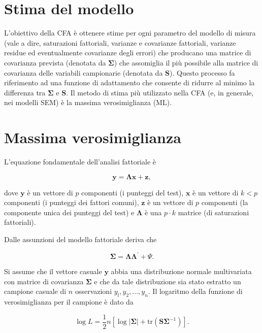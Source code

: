 \documentclass[
  11pt,
]{krantz}
\theoremstyle{definition}
\theoremstyle{definition}
\theoremstyle{definition}
\theoremstyle{definition}
\theoremstyle{remark}
\begin{document}
\hypertarget{stima-del-modello}{%
\section{Stima del modello}\label{stima-del-modello}}

L'obiettivo della CFA è ottenere stime per ogni parametro del modello di misura (vale a dire, saturazioni fattoriali, varianze e covarianze fattoriali, varianze residue ed eventualmente covarianze degli errori) che producano una matrice di covarianza prevista (denotata da \(\boldsymbol{\Sigma}\)) che assomiglia il più possibile alla matrice di covarianza delle variabili campionarie (denotata da \(\boldsymbol{S}\)). Questo processo fa riferimento ad una funzione di adattamento che consente di ridurre al minimo la differenza tra \(\boldsymbol{\Sigma}\) e \(\boldsymbol{S}\). Il metodo di stima più utilizzato nella CFA (e, in generale, nei modelli SEM) è la massima verosimiglianza (ML).

\hypertarget{massima-verosimiglianza}{%
\section{Massima verosimiglianza}\label{massima-verosimiglianza}}

L'equazione fondamentale dell'analisi fattoriale è

\[
\boldsymbol y = \boldsymbol \Lambda  \boldsymbol x  + \boldsymbol z, 
\]

dove \(\boldsymbol{y}\) è un vettore di \(p\) componenti (i punteggi del test), \(\boldsymbol{x}\) è un vettore di \(k < p\) componenti (i punteggi dei fattori comuni), \(\boldsymbol{z}\) è un vettore di \(p\) componenti (la componente unica dei punteggi del test) e \(\boldsymbol{\Lambda}\) è una \(p \cdot k\) matrice (di saturazioni fattoriali).

Dalle assunzioni del modello fattoriale deriva che

\[
\boldsymbol{\Sigma} = \boldsymbol{\Lambda}\boldsymbol{\Lambda}^\prime + \Psi.
\]

Si assume che il vettore casuale \(\boldsymbol{y}\) abbia una distribuzione normale multivariata con matrice di covarianza \(\boldsymbol{\Sigma}\) e che da tale distribuzione sia stato estratto un campione casuale di \(n\) osservazioni \(y_l, y_2, \dots, y_n\). Il logaritmo della funzione di verosimiglianza per il campione è dato da

\[
\log L = \frac{1}{2}n [\log | \boldsymbol{\Sigma}| + \mbox{tr}(\boldsymbol{\boldsymbol{S} \Sigma}^{-1})].
\]
\end{document}
